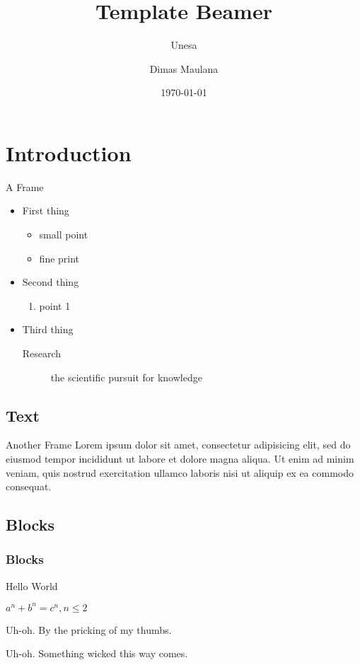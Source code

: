\documentclass[10pt,aspectratio=169]{beamer}
\title{Template Beamer}
\subtitle{Unesa}
\author{Dimas Maulana}
\date{\today}
\institute{Program Studi S1 Sains Aktuaria}
\begin{document}
\begin{frame}[plain]
	\titlepage
\end{frame}

\section{Introduction}
\begin{frame}{A Frame}
\begin{itemize}
\item First thing
	\begin{itemize}
	\item small point
	\item fine print
	\end{itemize}
\item Second thing
	\begin{enumerate}
	\item point 1
	\end{enumerate}
\item Third thing
	\begin{description}
	\item[Research] the scientific pursuit for knowledge
	\end{description}
\end{itemize}
\end{frame}

\subsection{Text}
\begin{frame}{Another Frame}
Lorem ipsum dolor sit amet, consectetur adipisicing elit, sed do eiusmod tempor incididunt ut labore et dolore magna aliqua. Ut enim ad minim veniam, quis nostrud exercitation ullamco laboris nisi ut aliquip ex ea commodo consequat.
\end{frame}

\subsection{Blocks}
\begin{frame}
\frametitle{Blocks}
\begin{definition}[Greetings]
Hello World
\end{definition}

\begin{theorem}
$a^n + b^n = c^n, n \leq 2$
\end{theorem}

\begin{alertblock}{Uh-oh.}
By the pricking of my thumbs.
\end{alertblock}

\begin{exampleblock}{Uh-oh.}
Something wicked this way comes.
\end{exampleblock}

\end{frame}

\end{document}
